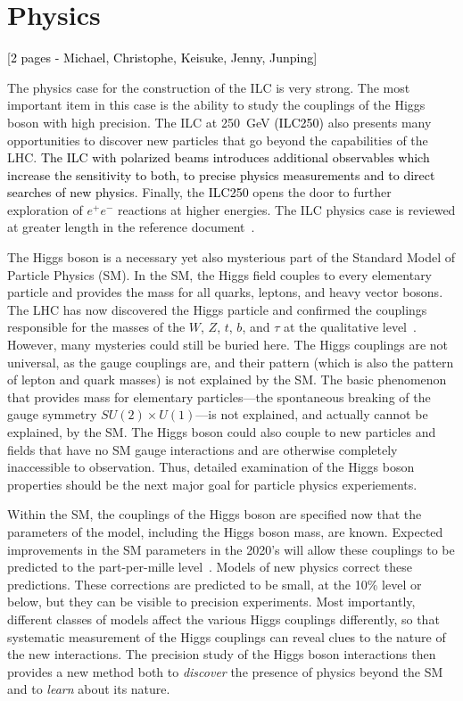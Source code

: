 \documentclass[%
 reprint,
 amsmath,amssymb,
 aps,
]{revtex4-1}
\newcommand{\juan}[1]{\textcolor{black}{{#1}}}
\newcommand{\jim}[1]{\textcolor{black}{#1}}
\newcommand{\todo}[1]{\textcolor{black}{{#1}}}
\def\ee{e^+e^-}
\begin{document}
\section{\label{sec:phys}Physics}

\todo{  [2 pages - Michael, Christophe, Keisuke, Jenny, Junping] }

The physics case for the construction of the ILC is very strong.   The
most important item in this case is the ability to study the couplings
of the Higgs boson with high precision.  The ILC at 250~GeV \juan{(ILC250)} also
presents many opportunities to discover new particles that go beyond
the capabilities of the LHC.  \juan{The ILC with polarized beams \jim{introduces} additional observables 
which increase the sensitivity to both, to precise physics measurements and to direct searches of new physics}. Finally, the \juan{ILC250} opens the
door to further exploration of $\ee$ reactions at higher energies. 
The ILC physics case is reviewed at greater length in the reference
document~\cite{ILCforESS}. 

The Higgs boson is a necessary yet also mysterious part of the
Standard Model of Particle Physics (SM).    In the SM, the Higgs field
couples to every elementary particle and provides the mass for all
quarks, leptons, and heavy vector bosons.   The LHC has now discovered
the Higgs particle and confirmed the couplings responsible for the
masses of the $W$, $Z$, $t$, $b$, and $\tau$ at the qualitative
level~\cite{LHCHiggssummary}.  However, many mysteries could still be
buried here.   The Higgs couplings are not universal, as the gauge
couplings are, and their pattern (which is also the pattern of lepton
and quark masses) is not explained by the SM.  The basic phenomenon that provides
mass for elementary particles---the spontaneous breaking of the gauge
symmetry $SU(2)\times U(1)$---is not explained, and actually cannot be
explained, by the SM.   The Higgs boson could also couple to new
particles and fields that have no SM gauge interactions and are
otherwise completely inaccessible to observation.  Thus, detailed
examination of the Higgs boson properties should be the next major
goal for particle physics experiements.

Within the SM, the couplings of the Higgs boson are specified now that
the parameters of the model, including the Higgs boson mass, are
known.  Expected improvements in the SM parameters in the 2020's will
allow these couplings to be predicted to the part-per-mille level~\cite{Lepage:2014fla}.
Models of new physics correct  these predictions.   These corrections
are predicted to be small, at the 10\% level or below, but they can
be visible to precision experiments.   Most importantly, different
classes of models affect the various Higgs couplings differently, so that
systematic measurement of the Higgs couplings can reveal clues to the
nature of the new interactions.   The precision study of the Higgs
boson interactions then provides a new method both to {\it discover}  the
presence of physics beyond the SM and to {\it learn}  about its nature.
\end{document}
